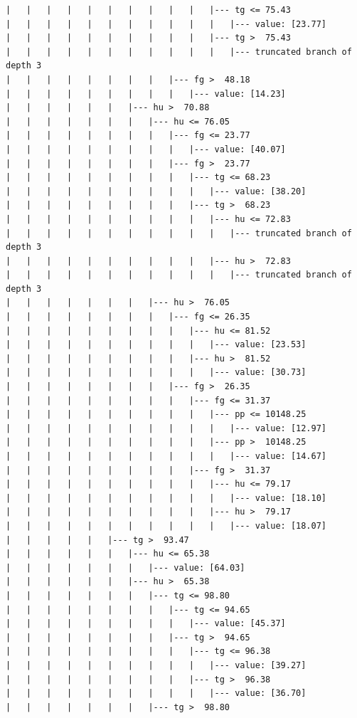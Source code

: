 \documentclass[UTF8, a4paper]{ctexart}
\begin{document}
\begin{lstlisting}
|   |   |   |   |   |   |   |   |   |   |--- tg <= 75.43
|   |   |   |   |   |   |   |   |   |   |   |--- value: [23.77]
|   |   |   |   |   |   |   |   |   |   |--- tg >  75.43
|   |   |   |   |   |   |   |   |   |   |   |--- truncated branch of depth 3
|   |   |   |   |   |   |   |   |--- fg >  48.18
|   |   |   |   |   |   |   |   |   |--- value: [14.23]
|   |   |   |   |   |   |--- hu >  70.88
|   |   |   |   |   |   |   |--- hu <= 76.05
|   |   |   |   |   |   |   |   |--- fg <= 23.77
|   |   |   |   |   |   |   |   |   |--- value: [40.07]
|   |   |   |   |   |   |   |   |--- fg >  23.77
|   |   |   |   |   |   |   |   |   |--- tg <= 68.23
|   |   |   |   |   |   |   |   |   |   |--- value: [38.20]
|   |   |   |   |   |   |   |   |   |--- tg >  68.23
|   |   |   |   |   |   |   |   |   |   |--- hu <= 72.83
|   |   |   |   |   |   |   |   |   |   |   |--- truncated branch of depth 3
|   |   |   |   |   |   |   |   |   |   |--- hu >  72.83
|   |   |   |   |   |   |   |   |   |   |   |--- truncated branch of depth 3
|   |   |   |   |   |   |   |--- hu >  76.05
|   |   |   |   |   |   |   |   |--- fg <= 26.35
|   |   |   |   |   |   |   |   |   |--- hu <= 81.52
|   |   |   |   |   |   |   |   |   |   |--- value: [23.53]
|   |   |   |   |   |   |   |   |   |--- hu >  81.52
|   |   |   |   |   |   |   |   |   |   |--- value: [30.73]
|   |   |   |   |   |   |   |   |--- fg >  26.35
|   |   |   |   |   |   |   |   |   |--- fg <= 31.37
|   |   |   |   |   |   |   |   |   |   |--- pp <= 10148.25
|   |   |   |   |   |   |   |   |   |   |   |--- value: [12.97]
|   |   |   |   |   |   |   |   |   |   |--- pp >  10148.25
|   |   |   |   |   |   |   |   |   |   |   |--- value: [14.67]
|   |   |   |   |   |   |   |   |   |--- fg >  31.37
|   |   |   |   |   |   |   |   |   |   |--- hu <= 79.17
|   |   |   |   |   |   |   |   |   |   |   |--- value: [18.10]
|   |   |   |   |   |   |   |   |   |   |--- hu >  79.17
|   |   |   |   |   |   |   |   |   |   |   |--- value: [18.07]
|   |   |   |   |   |--- tg >  93.47
|   |   |   |   |   |   |--- hu <= 65.38
|   |   |   |   |   |   |   |--- value: [64.03]
|   |   |   |   |   |   |--- hu >  65.38
|   |   |   |   |   |   |   |--- tg <= 98.80
|   |   |   |   |   |   |   |   |--- tg <= 94.65
|   |   |   |   |   |   |   |   |   |--- value: [45.37]
|   |   |   |   |   |   |   |   |--- tg >  94.65
|   |   |   |   |   |   |   |   |   |--- tg <= 96.38
|   |   |   |   |   |   |   |   |   |   |--- value: [39.27]
|   |   |   |   |   |   |   |   |   |--- tg >  96.38
|   |   |   |   |   |   |   |   |   |   |--- value: [36.70]
|   |   |   |   |   |   |   |--- tg >  98.80

\end{lstlisting}
\end{document}
